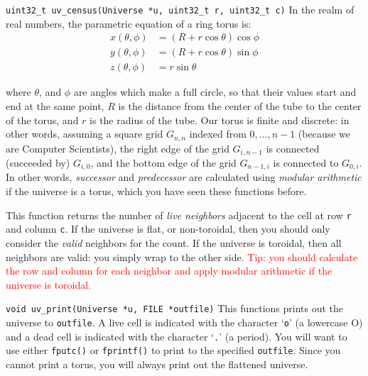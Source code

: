 \begin{funcdoc}{\texttt{uint32\_t uv\_census(Universe *u, uint32\_t r, uint32\_t c)}}
  In the realm of real numbers, the parametric equation of a ring torus is:
\begin{align*}
x(\theta, \phi) &= (R + r \cos \theta) \cos \phi \\
y(\theta, \phi) &= (R + r \cos \theta) \sin \phi \\
z(\theta, \phi) &= r \sin \theta
\end{align*}

  \noindent where $\theta$, and $\phi$ are angles which make a full circle, so
  that their values start and end at the same point, $R$ is the distance from the
  center of the tube to the center of the torus, and $r$ is the radius of the
  tube.  Our torus is finite and discrete: in other words, assuming a square grid
  $G_{n,n}$ indexed from $0, \ldots, n-1$ (because we are Computer Scientists),
  the right edge of the grid $G_{i, n-1}$ is connected (succeeded by) $G_{i, 0}$,
  and the bottom edge of the grid $G_{n-1, i}$ is connected to $G_{0, i}$. In
  other words, \emph{successor} and \emph{predecessor} are calculated using
  \emph{modular arithmetic} if the universe is a torus, which you have seen these
  functions before.

  This function returns the number of \emph{live neighbors} adjacent to the cell
  at row \texttt{r} and column \texttt{c}. If the universe is flat, or
  non-toroidal, then you should only consider the \emph{valid} neighbors for the
  count. If the universe is toroidal, then all neighbors are valid: you simply
  wrap to the other side. \textcolor{red}{Tip: you should calculate the row and
  column for each neighbor and apply modular arithmetic if the universe is
  toroidal.}
\end{funcdoc}

\begin{funcdoc}{\texttt{void uv\_print(Universe *u, FILE *outfile)}}
  This functions prints out the universe to \texttt{outfile}. A live cell is
  indicated with the character `\texttt{o}' (a lowercase O) and a dead cell is
  indicated with the character `\texttt{.}' (a period). You will want to use
  either \texttt{fputc()} or \texttt{fprintf()} to print to the specified
  \texttt{outfile}. Since you cannot print a torus, you will always print out
  the flattened universe.
\end{funcdoc}
